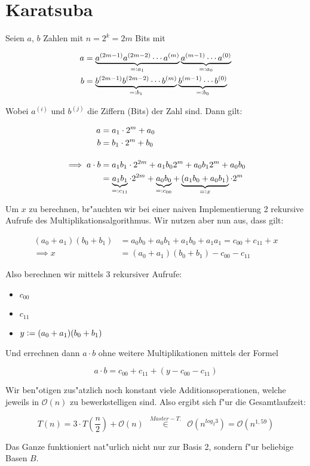 \documentclass{scrartcl}
\newcommand{\defeq}{\vcentcolon=}
\newcommand{\eqdef}{=\vcentcolon}
\newcommand{\bigO}{\ensuremath{\mathcal{O}}}
\begin{document}
\section{Karatsuba}
Seien $a$, $b$ Zahlen mit $n = 2^k = 2m$ Bits mit

\begin{align*}
a &= \underbrace{a^{(2m-1)}a^{(2m-2)}\cdots a^{(m)}}_{\eqdef a_1}\underbrace{a^{(m-1)} \cdots a^{(0)}}_{\eqdef a_0} \\
b &= \underbrace{b^{(2m-1)}b^{(2m-2)}\cdots b^{(m)}}_{\eqdef b_1}\underbrace{b^{(m-1)} \cdots b^{(0)}}_{\eqdef b_0}
\end{align*}

Wobei $a^{(i)}$ und $b^{(j)}$ die Ziffern (Bits) der Zahl sind. Dann gilt:

\begin{align*}
a &= a_1\cdot 2^m + a_0 \\
b &= b_1\cdot 2^m + b_0 \\[1em]
\implies a \cdot b &= a_1 b_1\cdot 2^{2m} + a_1 b_0 2^m + a_0 b_1 2^m + a_0 b_0 \\
&= \underbrace{a_1 b_1}_{\eqdef c_{11}}\cdot 2^{2m} + \underbrace{a_0 b_0}_{\eqdef c_{00}}
                            + \underbrace{(a_1 b_0 + a_0 b_1)}_{\eqdef x}\cdot 2^m
\end{align*}

Um $x$ zu berechnen, br"auchten wir bei einer naiven Implementierung 2 rekursive Aufrufe des
Multiplikationsalgorithmus. Wir nutzen aber nun aus, dass gilt:

\begin{align*}
  (a_0 + a_1)(b_0 + b_1) &= a_0 b_0 + a_0 b_1 + a_1 b_0 + a_1 a_1 = c_{00} + c_{11} + x \\
  \implies x &= (a_0 + a_1)(b_0 + b_1) - c_{00} - c_{11}
\end{align*}

Also berechnen wir mittels 3 rekursiver Aufrufe:

\begin{itemize}
\item $c_{00}$
\item $c_{11}$
\item $y \defeq (a_0 + a_1)(b_0 + b_1)$
\end{itemize}

Und errechnen dann $a \cdot b$ ohne weitere Multiplikationen mittels der Formel

\[ a \cdot b = c_{00} + c_{11} + \left(y - c_{00} - c_{11}\right) \]

Wir ben"otigen zus"atzlich noch konstant viele Additionsoperationen, welche jeweils
in $\bigO(n)$ zu bewerkstelligen sind. Also ergibt sich f"ur die Gesamtlaufzeit:

\[ T(n) = 3\cdot T\left(\frac{n}{2}\right) + \bigO(n)\ \  \overset{Master-T.}{\in} \ \ \bigO(n^{log_2 3}) = \bigO(n^{1,59})\]

Das Ganze funktioniert nat"urlich nicht nur zur Basis 2, sondern f"ur beliebige Basen $B$.
\end{document}
